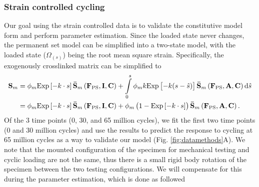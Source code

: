 \subsubsection{Strain controlled cycling}
	Our goal using the strain controlled data is to validate the constitutive model form and perform parameter estimation. Since the loaded state never changes, the permanent set model can be simplified into a two-state model, with the loaded state ($\Omega_(s)$) being the root mean square strain. Specifically, the exogenously crosslinked matrix can be simplified to
\begin{equation} 
\begin{split}
\mathbf{S}_m &= \phi_m \mathrm{Exp}\left[-k  \cdot s\right] \mathbf{\bar{S}}_m \left(\mathbf{F}_\mathrm{PS}, \mathbf{I},\mathbf{C}\right) + \int\displaylimits_0^s \phi_m k  \mathrm{Exp}\left[-k (s - \hat{s})\right] \mathbf{\bar{S}}_m \left(\mathbf{F}_\mathrm{PS}, \mathbf{A},\mathbf{C}\right) \mathrm{d}\hat{s} \\
&= \phi_m \mathrm{Exp}\left[-k  \cdot s\right] \mathbf{\bar{S}}_m \left(\mathbf{F}_\mathrm{PS}, \mathbf{I},\mathbf{C}\right) + \phi_m \left(1 - \mathrm{Exp}\left[-k  \cdot s\right] \right) \mathbf{\bar{S}}_m \left(\mathbf{F}_\mathrm{PS}, \mathbf{A},\mathbf{C}\right).
\end{split}
\end{equation}
Of the 3 time points (0, 30, and 65 million cycles), we fit the first two time points (0 and 30 million cycles) and use the results to predict the response to cycling at 65 million cycles as a way to validate our model (Fig. \ref{fig:datamethods}A). We note that the mounted configuration of the specimen for mechanical testing and cyclic loading are not the same, thus there is a small rigid body rotation of the specimen between the two testing configurations. We will compensate for this during the parameter estimation, which is done as followed
